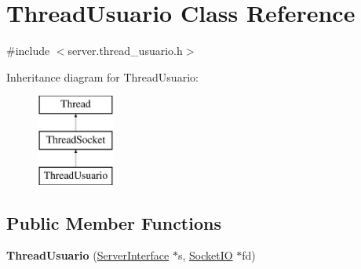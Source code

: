 \hypertarget{classThreadUsuario}{\section{Thread\-Usuario Class Reference}
\label{classThreadUsuario}
}


{\ttfamily \#include $<$server.\-thread\-\_\-usuario.\-h$>$}

Inheritance diagram for Thread\-Usuario\-:\begin{figure}[H]
\begin{center}
\leavevmode
\includegraphics[height=3.000000cm]{classThreadUsuario}
\end{center}
\end{figure}
\subsection*{Public Member Functions}
\begin{DoxyCompactItemize}
\item 
\hypertarget{classThreadUsuario_a89614bb5871f99c8effaba450e5aa4f0}{{\bfseries Thread\-Usuario} (\hyperlink{classServerInterface}{Server\-Interface} $\ast$s, \hyperlink{classSocketIO}{Socket\-I\-O} $\ast$fd)}\label{classThreadUsuario_a89614bb5871f99c8effaba450e5aa4f0}

\end{DoxyCompactItemize}
